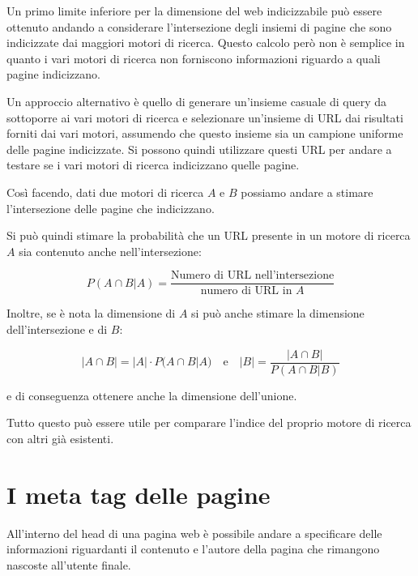 


Un primo limite inferiore per la dimensione del web indicizzabile può essere ottenuto andando a considerare l'intersezione degli insiemi di pagine che sono indicizzate dai maggiori motori di ricerca.
Questo calcolo però non è semplice in quanto i vari motori di ricerca non forniscono informazioni riguardo a quali pagine indicizzano.

Un approccio alternativo è quello di generare un'insieme casuale di query da sottoporre ai vari motori di ricerca e selezionare un'insieme di URL dai risultati forniti dai vari motori, assumendo che questo insieme sia un campione uniforme delle pagine indicizzate.
Si possono quindi utilizzare questi URL per andare a testare se i vari motori di ricerca indicizzano quelle pagine.

Così facendo, dati due motori di ricerca $A$ e $B$ possiamo andare a stimare l'intersezione delle pagine che indicizzano.

Si può quindi stimare la probabilità che un URL presente in un motore di ricerca $A$ sia contenuto anche nell'intersezione:

$$
P(A \cap B | A) = \frac{\text{Numero di URL nell'intersezione}}{\text{numero di URL in }A}
$$

Inoltre, se è nota la dimensione di $A$ si può anche stimare la dimensione dell'intersezione e di $B$:

$$
|A \cap B| = |A| \cdot P(A \cap B | A) \quad \text{e} \quad |B| = \frac{|A \cap B|}{P(A \cap B | B)}
$$

e di conseguenza ottenere anche la dimensione dell'unione.

Tutto questo può essere utile per comparare l'indice del proprio motore di ricerca con altri già esistenti.


\section{I meta tag delle pagine}

All'interno del head di una pagina web è possibile andare a specificare delle informazioni riguardanti il contenuto e l'autore della pagina che rimangono nascoste all'utente finale.

